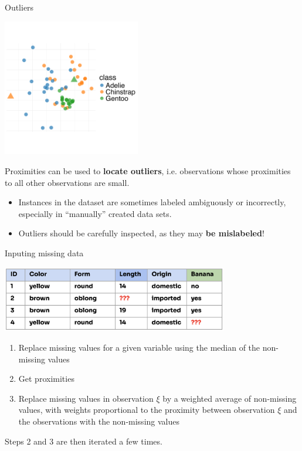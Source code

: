 \documentclass[11pt,compress,t,notes=noshow, xcolor=table]{beamer}
\begin{document}
\begin{vbframe}{Outliers}
\vspace{-6ex}
\begin{center}
\includegraphics[width=0.45\textwidth]{figure/forest-prox-vis_2.png}
\end{center}
\vspace{-4ex}

Proximities can be used to \textbf{locate outliers}, i.e. observations whose proximities to all other observations are small.

\begin{itemize}
\item Instances in the dataset are sometimes labeled ambiguously or incorrectly, especially in \enquote{manually} created data sets.
\item Outliers should be carefully inspected, as they may \textbf{be mislabeled}!
\end{itemize}
\end{vbframe}


\begin{vbframe}{Inputing missing data}
\begin{center}
\includegraphics[width=0.74\textwidth]{figure_man/forest-missing_value.png}
\end{center}
\begin{enumerate}
\item Replace missing values for a given variable using the median of the non-missing values
\item Get proximities
\item Replace missing values in observation $\xi$ by a weighted average of non-missing values, with weights proportional to the proximity between observation $\xi$ and the observations with the non-missing values
\end{enumerate}
Steps 2 and 3 are then iterated a few times. %
\end{vbframe}

\endlecture
\end{document}
